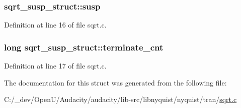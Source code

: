 \subsubsection[{\texorpdfstring{susp}{susp}}]{ sqrt\+\_\+susp\+\_\+struct\+::susp}\hypertarget{structsqrt__susp__struct_ac8190bf38cc5a145a4b9a5bb8443044b}{}\label{structsqrt__susp__struct_ac8190bf38cc5a145a4b9a5bb8443044b}


Definition at line 16 of file sqrt.\+c.

\subsubsection[{\texorpdfstring{terminate\+\_\+cnt}{terminate_cnt}}]{\setlength{\rightskip}{0pt plus 5cm}long sqrt\+\_\+susp\+\_\+struct\+::terminate\+\_\+cnt}\hypertarget{structsqrt__susp__struct_aa85a35584385b8fa02cf23e17b209ebc}{}\label{structsqrt__susp__struct_aa85a35584385b8fa02cf23e17b209ebc}


Definition at line 17 of file sqrt.\+c.



The documentation for this struct was generated from the following file\+:\begin{DoxyCompactItemize}
\item 
C\+:/\+\_\+dev/\+Open\+U/\+Audacity/audacity/lib-\/src/libnyquist/nyquist/tran/\hyperlink{sqrt_8c}{sqrt.\+c}\end{DoxyCompactItemize}
